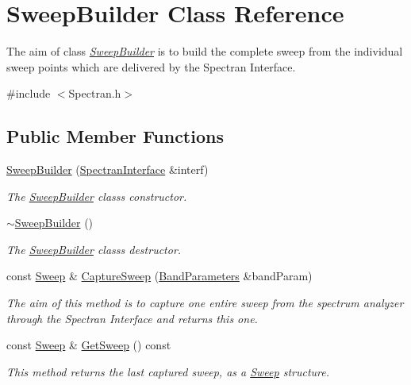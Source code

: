 \hypertarget{classSweepBuilder}{}\section{Sweep\+Builder Class Reference}
\label{classSweepBuilder}


The aim of class {\itshape \hyperlink{classSweepBuilder}{Sweep\+Builder}} is to build the complete sweep from the individual sweep points which are delivered by the Spectran Interface.  




{\ttfamily \#include $<$Spectran.\+h$>$}

\subsection*{Public Member Functions}
\begin{DoxyCompactItemize}
\item 
\hyperlink{classSweepBuilder_a41b1ecbd8c74953fe0ad5bfbf03be667}{Sweep\+Builder} (\hyperlink{classSpectranInterface}{Spectran\+Interface} \&interf)
\begin{DoxyCompactList}\small\item\em The \hyperlink{classSweepBuilder}{Sweep\+Builder} class\textquotesingle{}s constructor. \end{DoxyCompactList}\item 
\mbox{\label{classSweepBuilder_aa1be2613794ac488f3bf6c0b722c48d3}} 
\hyperlink{classSweepBuilder_aa1be2613794ac488f3bf6c0b722c48d3}{$\sim$\+Sweep\+Builder} ()
\begin{DoxyCompactList}\small\item\em The \hyperlink{classSweepBuilder}{Sweep\+Builder} class\textquotesingle{}s destructor. \end{DoxyCompactList}\item 
const \hyperlink{structSweep}{Sweep} \& \hyperlink{classSweepBuilder_ae8893395594bbf68873d33e3e7a0d192}{Capture\+Sweep} (\hyperlink{structBandParameters}{Band\+Parameters} \&band\+Param)
\begin{DoxyCompactList}\small\item\em The aim of this method is to capture one entire sweep from the spectrum analyzer through the Spectran Interface and returns this one. \end{DoxyCompactList}\item 
\mbox{\label{classSweepBuilder_a5b7e3e8d18afb651927be8ea6e7ef1e1}} 
const \hyperlink{structSweep}{Sweep} \& \hyperlink{classSweepBuilder_a5b7e3e8d18afb651927be8ea6e7ef1e1}{Get\+Sweep} () const
\begin{DoxyCompactList}\small\item\em This method returns the last captured sweep, as a {\itshape \hyperlink{structSweep}{Sweep}} structure. \end{DoxyCompactList}\end{DoxyCompactItemize}



